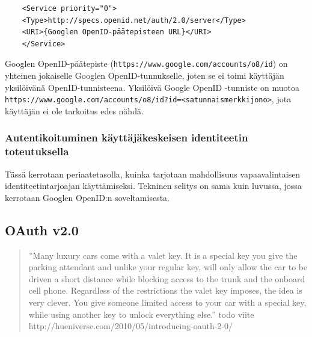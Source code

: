 \documentclass[finnish,gradu]{tktltiki}
\begin{document}
  \begin{verbatim}
    <Service priority="0">
    <Type>http://specs.openid.net/auth/2.0/server</Type>
    <URI>{Googlen OpenID-päätepisteen URL}</URI>
    </Service>
  \end{verbatim}

  Googlen OpenID-päätepiste (\verb#https://www.google.com/accounts/o8/id#) on yhteinen jokaiselle Googlen OpenID-tunnukselle, joten se ei toimi käyttäjän yksilöivänä OpenID-tunnisteena. Yksilöivä Google OpenID -tunniste on muotoa \verb#https://www.google.com/accounts/o8/id?id=<satunnaismerkkijono>#, jota käyttäjän ei ole tarkoitus edes nähdä.





  \subsubsection{Autentikoituminen käyttäjäkeskeisen identiteetin toteutuksella} %
  \label{sub:autentikoituminen_käyttäjäkeskeisellä_identiteetillä}
  Tässä kerrotaan periaatetasolla, kuinka tarjotaan mahdollisuus vapaavalintaisen identiteetintarjoajan käyttämiseksi. Tekninen selitys on sama kuin luvussa, jossa kerrotaan Googlen OpenID:n soveltamisesta.


  \subsection{OAuth v2.0} %
  \label{sub:oauth}

  \begin{quote}
    ''Many luxury cars come with a valet key. It is a special key you give the parking attendant and unlike your regular key, will only allow the car to be driven a short distance while blocking access to the trunk and the onboard cell phone. Regardless of the restrictions the valet key imposes, the idea is very clever. You give someone limited access to your car with a special key, while using another key to unlock everything else.''
    todo viite http://hueniverse.com/2010/05/introducing-oauth-2-0/
  \end{quote}
\end{document}
